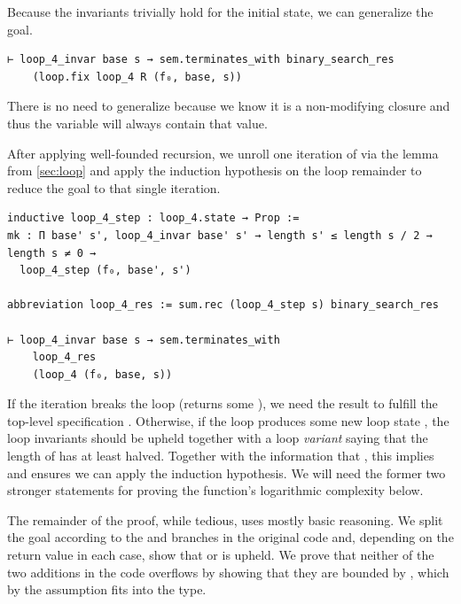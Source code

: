 Because the invariants trivially hold for the initial state, we can generalize
the goal.

\begin{verbatim}
⊢ loop_4_invar base s → sem.terminates_with binary_search_res
    (loop.fix loop_4 R (f₀, base, s))
\end{verbatim}

There is no need to generalize  because we know it is a non-modifying closure
and thus the variable  will always contain that value.

After applying well-founded recursion, we unroll one iteration of
 via the lemma  from \autoref{sec:loop} and
apply the induction hypothesis on the loop remainder to reduce the goal to that
single iteration.

\begin{verbatim}
inductive loop_4_step : loop_4.state → Prop :=
mk : Π base' s', loop_4_invar base' s' → length s' ≤ length s / 2 → length s ≠ 0 →
  loop_4_step (f₀, base', s')

abbreviation loop_4_res := sum.rec (loop_4_step s) binary_search_res

⊢ loop_4_invar base s → sem.terminates_with
    loop_4_res
    (loop_4 (f₀, base, s))
\end{verbatim}

If the iteration breaks the loop (returns some ), we need the
result to fulfill the top-level specification .
Otherwise, if the loop produces
some new loop state , the loop invariants should be upheld
together with a loop \emph{variant} saying that the length of  has at
least halved. Together with the information that , this
implies  and ensures we can apply the induction
hypothesis. We will
need the former two stronger statements for proving the function's logarithmic
complexity below.

The remainder of the proof, while tedious, uses mostly basic reasoning. We split
the goal according to the  and  branches in the original
code and, depending on the return value in each case, show that
 or  is upheld. We prove that neither
of the two additions in the code overflows by showing that they are bounded by
, which by the assumption  fits into
the  type.